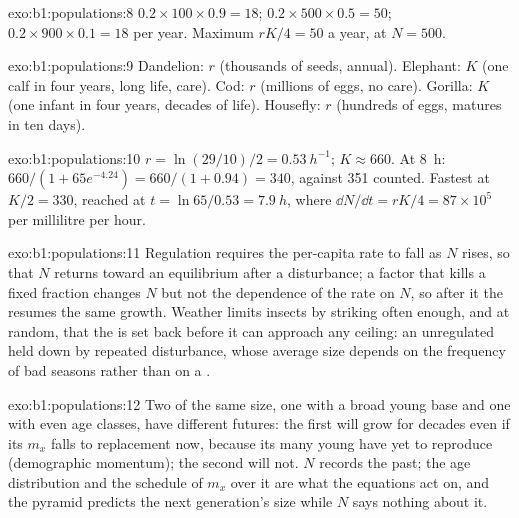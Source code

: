 \begin{solution}{exo:b1:populations:8}
$0.2\times 100\times 0.9 = 18$; $0.2\times 500\times 0.5 = 50$;
$0.2\times 900\times 0.1 = 18$ per year. Maximum $rK/4 = 50$ a year, at
$N = 500$.
\end{solution}

\begin{solution}{exo:b1:populations:9}
Dandelion: $r$ (thousands of seeds, annual). Elephant: $K$ (one calf
in four years, long life, care). Cod: $r$ (millions of eggs, no care).
Gorilla: $K$ (one infant in four years, decades of life). Housefly: $r$
(hundreds of eggs, matures in ten days).
\end{solution}

\begin{solution}{exo:b1:populations:10}
$r = \ln(29/10)/2 = \qty{0.53}{h^{-1}}$; $K \approx 660$. At \qty{8}{h}:
$660/(1 + 65e^{-4.24}) = 660/(1 + 0.94) = 340$, against 351 counted.
Fastest at $K/2 = 330$, reached at $t = \ln 65/0.53 = \qty{7.9}{h}$,
where $\dd N/\dd t = rK/4 = 87\times 10^5$  per millilitre per
hour.
\end{solution}

\begin{solution}{exo:b1:populations:11}
Regulation requires the per-capita rate to fall as $N$ rises, so that
$N$ returns toward an equilibrium after a disturbance; a factor that
kills a fixed fraction changes $N$ but not the dependence of the rate
on $N$, so after it the  resumes the same growth. Weather
limits insects by striking often enough, and at random, that the
 is set back before it can approach any ceiling: an
unregulated  held down by repeated disturbance, whose
average size depends on the frequency of bad seasons rather than on a
.
\end{solution}

\begin{solution}{exo:b1:populations:12}
Two  of the same size, one with a broad young base and one
with even age classes, have different futures: the first will grow
for decades even if its $m_x$ falls to replacement now, because its
many young have yet to reproduce (demographic momentum); the second
will not. $N$ records the past; the age distribution and the
schedule of $m_x$ over it are what the equations act on, and the
pyramid predicts the next generation's size while $N$ says nothing
about it.
\end{solution}

